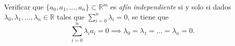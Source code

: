 \begin{ejercicio}
Verificar que $\{a_0, a_1, \dots, a_n\} \subset \mathbb{R}^m$ es \textit{afín independiente} si y solo si dados $\lambda_0, \lambda_1, \dots, \lambda_n \in \mathbb{R}$ tales que $\sum_{i=0}^n \lambda_i = 0$, se tiene que
\[
\sum_{i=0}^n \lambda_i a_i = 0 \implies \lambda_0 = \lambda_1 = \dots = \lambda_n = 0.
\]
\end{ejercicio}

\begin{demostracion}

\end{demostracion}
